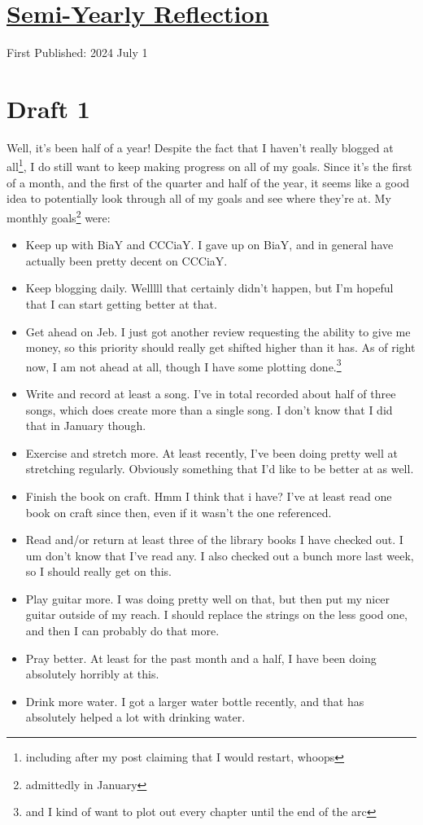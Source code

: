\documentclass[12pt]{article}[titlepage]
\renewcommand{\,}{\textsuperscript{,}}
\begin{document}
\doublespacing
\section{\href{reflection-2024a.html}{Semi-Yearly Reflection}}
First Published: 2024 July 1

\section{Draft 1}
Well, it's been half of a year!
Despite the fact that I haven't really blogged at all\footnote{including after my post claiming that I would restart, whoops}, I do still want to keep making progress on all of my goals.
Since it's the first of a month, and the first of the quarter and half of the year, it seems like a good idea to potentially look through all of my goals and see where they're at.
My monthly goals\footnote{admittedly in January} were:

\begin{itemize}
\item Keep up with BiaY and CCCiaY. I gave up on BiaY, and in general have actually been pretty decent on CCCiaY.
\item Keep blogging daily. Welllll that certainly didn't happen, but I'm hopeful that I can start getting better at that.
\item Get ahead on Jeb. I just got another review requesting the ability to give me money, so this priority should really get shifted higher than it has. As of right now, I am not ahead at all, though I have some plotting done.\footnote{and I kind of want to plot out every chapter until the end of the arc}
\item Write and record at least a song. I've in total recorded about half of three songs, which does create more than a single song. I don't know that I did that in January though.
\item Exercise and stretch more. At least recently, I've been doing pretty well at stretching regularly. Obviously something that I'd like to be better at as well.
\item Finish the book on craft. Hmm I think that i have? I've at least read one book on craft since then, even if it wasn't the one referenced.
\item Read and/or return at least three of the library books I have checked out. I um don't know that I've read any. I also checked out a bunch more last week, so I should really get on this.
\item Play guitar more. I was doing pretty well on that, but then put my nicer guitar outside of my reach. I should replace the strings on the less good one, and then I can probably do that more.
\item Pray better. At least for the past month and a half, I have been doing absolutely horribly at this.
\item Drink more water. I got a larger water bottle recently, and that has absolutely helped a lot with drinking water.
\end{itemize}
\end{document}
